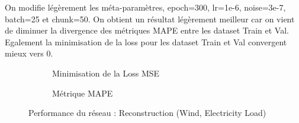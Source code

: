 \documentclass{article}
\begin{document}
    On modifie légèrement les méta-paramètres, epoch=300, lr=1e-6, noise=3e-7, batch=25 et chunk=50. On obtient un résultat légèrement meilleur car on vient de diminuer la divergence des métriques MAPE entre les dataset Train et Val. Egalement la minimisation de la loss pour les dataset Train et Val convergent mieux vers 0.
    \begin{figure}[H]
        \centering
        \begin{subfigure}[t]{0.49\textwidth}
            \caption{Minimisation de la Loss MSE}
        \end{subfigure}
        \hfill
        \begin{subfigure}[t]{0.49\textwidth}
        \caption{Métrique MAPE}
    \end{subfigure}
        \caption{Performance du réseau : Reconstruction (Wind, Electricity Load)}
        \label{fig:test}
    \end{figure}
\end{document}
